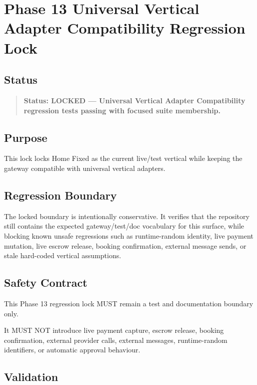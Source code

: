 \section{Phase 13 Universal Vertical Adapter Compatibility Regression Lock}
\label{sec:phase13-universal-vertical-adapter-compatibility-regression-lock}

\subsection{Status}

\begin{quote}
\textbf{Status: LOCKED --- Universal Vertical Adapter Compatibility regression tests passing with focused suite membership.}
\end{quote}

\subsection{Purpose}

This lock locks Home Fixed as the current live/test vertical while keeping the gateway compatible with universal vertical adapters.

\subsection{Regression Boundary}

The locked boundary is intentionally conservative. It verifies that the repository still contains the expected gateway/test/doc vocabulary for this surface, while blocking known unsafe regressions such as runtime-random identity, live payment mutation, live escrow release, booking confirmation, external message sends, or stale hard-coded vertical assumptions.

\subsection{Safety Contract}

This Phase 13 regression lock MUST remain a test and documentation boundary only.

It MUST NOT introduce live payment capture, escrow release, booking confirmation, external provider calls, external messages, runtime-random identifiers, or automatic approval behaviour.

\subsection{Validation}

